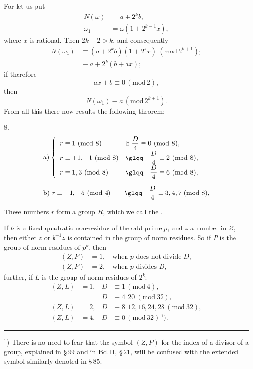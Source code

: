 For let us put
\[
\begin{aligned}
N(\omega) &= a + 2^k b,\\
\omega_1 &= \omega (1 + 2^{k-1} x),
\end{aligned}
\]
where $x$ is rational. Then $2k - 2 > k$, and consequently
\[
\begin{aligned}
N(\omega_1) &\equiv (a + 2^k b)(1 + 2^k x) \ (\mathrm{mod}\ 2^{k+1});\\
&\equiv a + 2^k (b + a x);
\end{aligned}
\]
if therefore
\[
a x + b \equiv 0 \ (\mathrm{mod}\ 2),
\]
then
\[
N(\omega_1) \equiv a \ (\mathrm{mod}\ 2^{k+1}).
\]
From all this there now results the following theorem:

8. 
\[
\begin{aligned}
& \text{a)} \left\{
\begin{array}{ll}
r \equiv 1 \ (\mathrm{mod}\ 8) & \text{if } \dfrac{D}{4} \equiv 0 \ (\mathrm{mod}\ 8),\\[4pt]
r \equiv +1, -1 \ (\mathrm{mod}\ 8) & \text{\glqq}\quad \dfrac{D}{4} \equiv 2 \ (\mathrm{mod}\ 8),\\[4pt]
r \equiv 1, 3 \ (\mathrm{mod}\ 8) & \text{\glqq}\quad \dfrac{D}{4} \equiv 6 \ (\mathrm{mod}\ 8),
\end{array}
\right. \\[6pt]
& \text{b)}\ r \equiv +1, -5 \ (\mathrm{mod}\ 4) \qquad \text{\glqq}\quad \dfrac{D}{4} \equiv 3, 4, 7 \ (\mathrm{mod}\ 8),
\end{aligned}
\]

These numbers $r$ form a group $R$, which we call the .

If $b$ is a fixed quadratic non-residue of the odd prime $p$, and $z$ a number in $Z$, then either $z$ or $b^{-1} z$ is contained in the group of norm residues. So if $P$ is the group of norm residues of $p^k$, then
\[
\begin{aligned}
(Z, P) &= 1, \quad \text{when } p \text{ does not divide } D,\\
(Z, P) &= 2, \quad \text{when } p \text{ divides } D,
\end{aligned}
\]
further, if $L$ is the group of norm residues of $2^k$:
\[
\begin{aligned}
(Z, L) &= 1, & D &\equiv 1 \ (\mathrm{mod}\ 4),\\
& & D &\equiv 4, 20 \ (\mathrm{mod}\ 32),\\
(Z, L) &= 2, & D &\equiv 8, 12, 16, 24, 28 \ (\mathrm{mod}\ 32),\\
(Z, L) &= 4, & D &\equiv 0 \ (\mathrm{mod}\ 32)\,^{1}).
\end{aligned}
\]

\par\noindent\rule{4cm}{0.4pt}\par
$^{1}$) There is no need to fear that the symbol $(Z, P)$ for the index of a divisor of a group, explained in \S\,99 and in Bd.\,II, \S\,21, will be confused with the extended  symbol similarly denoted in \S\,85.

